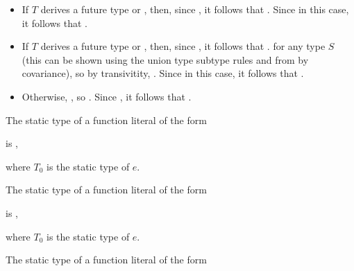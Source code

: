 \documentclass[makeidx]{article}
\begin{document}
{{\begin{itemize}
  \item If $T$ derives a future type 
    or , then, since ,
    it follows that . Since 
    in this case, it follows that .

  \item If $T$ derives a future type  or
    , then, since ,
    it follows that .
     for any type $S$
    (this can be shown using the union type subtype rules and from
     by covariance), so by transivitity,
    . Since  in this case,
    it follows that .

  \item Otherwise, , so
    . Since
    , it follows that
    .
  \end{itemize}
}

\LMHash{}%
The static type of a function literal of the form

\noindent
\code{<\TypeParametersStd>}

\noindent
{}

\noindent
is
,

\noindent
where $T_0$ is the static type of $e$.
\EndCase

\LMHash{}%
The static type of a function literal of the form

\noindent
\code{<\TypeParametersStd>}

\noindent
{}

\noindent
is
,

\noindent
where $T_0$ is the static type of $e$.
\EndCase

\LMHash{}%
The static type of a function literal of the form

}
\end{document}
